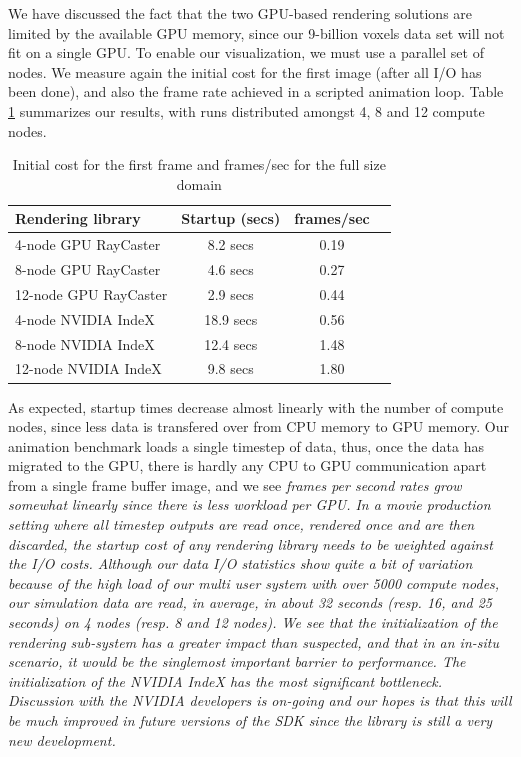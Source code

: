 \documentclass[5p,times]{elsarticle}
\begin{document}
We have discussed the fact that the two GPU-based rendering solutions
are limited by the available GPU memory, since our 9-billion voxels data set will
not fit on a single GPU. To enable our visualization, we must use a parallel 
set of nodes. We measure again the initial cost for the first image
(after all I/O has been done), and also the frame rate achieved in a scripted
animation loop. Table \ref{tab:parallelgpu-tab} summarizes our results, with runs distributed amongst 4, 8 and 12 compute nodes.

\begin{table}[htb]
  \centering
  \caption{
    Initial cost for the first frame and frames/sec for the full size domain
  }
  \label{tab:parallelgpu-tab}

  \begin{tabular}{lccc}
    \hline
    Rendering library & Startup (secs) & frames/sec\\
    \hline
     4-node GPU RayCaster & 8.2 secs &  0.19 \\
     8-node GPU RayCaster & 4.6 secs &  0.27 \\
    12-node GPU RayCaster & 2.9 secs &  0.44 \\
    \hline
     4-node NVIDIA IndeX & 18.9 secs &  0.56\\
     8-node NVIDIA IndeX & 12.4 secs &  1.48\\
    12-node NVIDIA IndeX & 9.8 secs &  1.80\\
    \hline

  \end{tabular}
\end{table}

As expected, startup times decrease almost linearly with the number of compute nodes,
since less data is transfered over from CPU memory to GPU memory. Our animation benchmark
loads a single timestep of data, thus, once the data has migrated to the GPU, there is
hardly any CPU to GPU communication apart from a single frame buffer image, and
we see \it{frames per second} \rm rates grow somewhat linearly since there is less workload per GPU. 
In a movie production setting where all timestep outputs are read once, rendered once
and are then discarded, the startup cost of any rendering library needs to be weighted
against the I/O costs. Although our data I/O statistics show quite a bit of variation
because of the high load of our multi user system with over 5000 compute nodes,
our simulation data are read, \it{in average}\rm, in about 32 seconds (resp. 16, and 25 seconds)
on 4 nodes (resp. 8 and 12 nodes). We see that the initialization of the rendering sub-system
has a greater impact than suspected, and that in an \it{in-situ} \rm scenario,
it would be the singlemost important barrier to performance. The initialization of
the NVIDIA IndeX has the most significant bottleneck. Discussion with the NVIDIA developers
is on-going and our hopes is that this will be much improved in future versions of the
SDK since the library is still a very new development.
\end{document}

